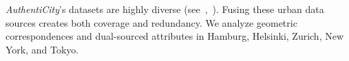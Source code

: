 \documentclass[sigconf,authordraft]{acmart}
\newcommand{\benchname}{\textit{Authenti\-City}}
\begin{document}
\benchname{}'s datasets are highly diverse 
(see~,~). Fusing these urban data sources creates both coverage and redundancy. We analyze geometric correspondences and dual-sourced attributes in Hamburg, Helsinki, Zurich, New York, and Tokyo. 
\end{document}
